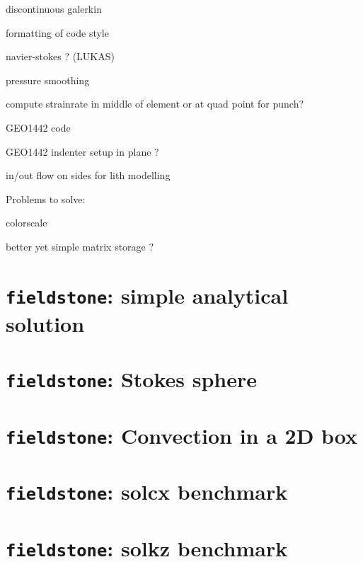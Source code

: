 \documentclass[a4paper]{article}
\begin{document}
discontinuous galerkin

formatting of code style

navier-stokes ? (LUKAS)

pressure smoothing

compute strainrate in middle of element or at quad point for punch?

GEO1442 code 

GEO1442 indenter setup in plane ?

in/out flow on sides for lith modelling

\noindent Problems to solve:

colorscale 

better yet simple matrix storage ?


\newpage
\section{{\tt fieldstone}: simple analytical solution \label{f1}}


\newpage
\section{{\tt fieldstone}: Stokes sphere }


\newpage
\section{{\tt fieldstone}: Convection in a 2D box}


\newpage
\section{{\tt fieldstone}: solcx benchmark}


\newpage
\section{{\tt fieldstone}: solkz benchmark}

\end{document}
